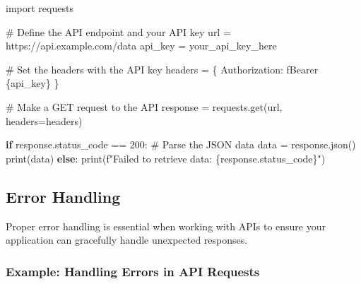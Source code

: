 \documentclass[
  letterpaper,
  DIV=11,
  numbers=noendperiod]{scrreprt}
\newenvironment{Shaded}{\begin{snugshade}}{\end{snugshade}}
\newcommand{\BuiltInTok}[1]{\textcolor[rgb]{0.00,0.23,0.31}{#1}}
\newcommand{\CommentTok}[1]{\textcolor[rgb]{0.37,0.37,0.37}{#1}}
\newcommand{\ControlFlowTok}[1]{\textcolor[rgb]{0.00,0.23,0.31}{\textbf{#1}}}
\newcommand{\DecValTok}[1]{\textcolor[rgb]{0.68,0.00,0.00}{#1}}
\newcommand{\ImportTok}[1]{\textcolor[rgb]{0.00,0.46,0.62}{#1}}
\newcommand{\NormalTok}[1]{\textcolor[rgb]{0.00,0.23,0.31}{#1}}
\newcommand{\OperatorTok}[1]{\textcolor[rgb]{0.37,0.37,0.37}{#1}}
\newcommand{\SpecialCharTok}[1]{\textcolor[rgb]{0.37,0.37,0.37}{#1}}
\newcommand{\SpecialStringTok}[1]{\textcolor[rgb]{0.13,0.47,0.30}{#1}}
\newcommand{\StringTok}[1]{\textcolor[rgb]{0.13,0.47,0.30}{#1}}
\begin{document}
\begin{Shaded}
\begin{Highlighting}[]
\ImportTok{import}\NormalTok{ requests}

\CommentTok{\# Define the API endpoint and your API key}
\NormalTok{url }\OperatorTok{=} \StringTok{\textquotesingle{}https://api.example.com/data\textquotesingle{}}
\NormalTok{api\_key }\OperatorTok{=} \StringTok{\textquotesingle{}your\_api\_key\_here\textquotesingle{}}

\CommentTok{\# Set the headers with the API key}
\NormalTok{headers }\OperatorTok{=}\NormalTok{ \{}
    \StringTok{\textquotesingle{}Authorization\textquotesingle{}}\NormalTok{: }\SpecialStringTok{f\textquotesingle{}Bearer }\SpecialCharTok{\{}\NormalTok{api\_key}\SpecialCharTok{\}}\SpecialStringTok{\textquotesingle{}}
\NormalTok{\}}

\CommentTok{\# Make a GET request to the API}
\NormalTok{response }\OperatorTok{=}\NormalTok{ requests.get(url, headers}\OperatorTok{=}\NormalTok{headers)}

\ControlFlowTok{if}\NormalTok{ response.status\_code }\OperatorTok{==} \DecValTok{200}\NormalTok{:}
    \CommentTok{\# Parse the JSON data}
\NormalTok{    data }\OperatorTok{=}\NormalTok{ response.json()}
    \BuiltInTok{print}\NormalTok{(data)}
\ControlFlowTok{else}\NormalTok{:}
    \BuiltInTok{print}\NormalTok{(}\SpecialStringTok{f"Failed to retrieve data: }\SpecialCharTok{\{}\NormalTok{response}\SpecialCharTok{.}\NormalTok{status\_code}\SpecialCharTok{\}}\SpecialStringTok{"}\NormalTok{)}
\end{Highlighting}
\end{Shaded}

\subsection{Error Handling}\label{error-handling}

Proper error handling is essential when working with APIs to ensure your
application can gracefully handle unexpected responses.

\subsubsection{Example: Handling Errors in API
Requests}\label{example-handling-errors-in-api-requests}
\end{document}

